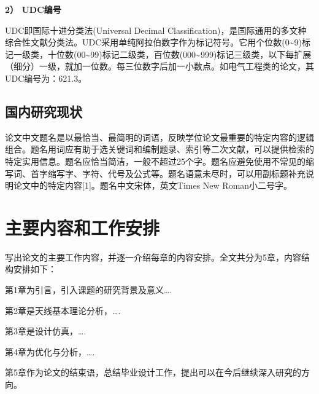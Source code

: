 \textbf{2） UDC编号	}

UDC即国际十进分类法(Universal Decimal Classification)，是国际通用的多文种综合性文献分类法。UDC采用单纯阿拉伯数字作为标记符号。它用个位数(0\textasciitilde9)标记一级类，十位数(00\textasciitilde99)标记二级类，百位数(000\textasciitilde999)标记三级类，以下每扩展（细分）一级，就加一位数。每三位数字后加一小数点。如电气工程类的论文，其UDC编号为：621.3。


\subsection{国内研究现状}
论文中文题名是以最恰当、最简明的词语，反映学位论文最重要的特定内容的逻辑组合。题名用词应有助于选关键词和编制题录、索引等二次文献，可以提供检索的特定实用信息。题名应恰当简洁，一般不超过25个字。题名应避免使用不常见的缩写词、首字缩写字、字符、代号及公式等。题名语意未尽时，可以用副标题补充说明论文中的特定内容[1]。题名中文宋体，英文Times New Roman小二号字。


\section{主要内容和工作安排}
写出论文的主要工作内容，并逐一介绍每章的内容安排。全文共分为5章，内容结构安排如下：

第1章为引言，引入课题的研究背景及意义….

第2章是天线基本理论分析，….

第3章是设计仿真，….

第4章为优化与分析，….

第5章作为论文的结束语，总结毕业设计工作，提出可以在今后继续深入研究的方向。


